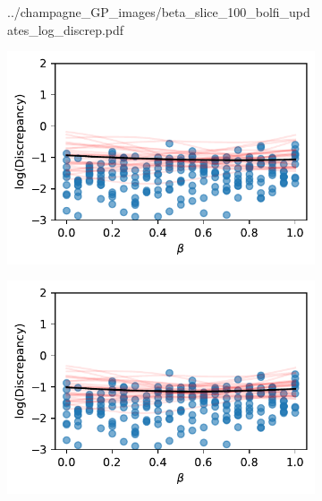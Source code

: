 \begin{figure}[htbp]
\begin{subfigure}[b]{0.5\textwidth}
{            ../champagne_GP_images/beta_slice_100_bolfi_updates_log_discrep.pdf
        }
    \end{subfigure}
    \hfill%
    \begin{subfigure}[b]{0.5\textwidth}
        \centering
        \includegraphics[width=\textwidth]{
            ../champagne_GP_images/beta_slice_200_bolfi_updates_log_discrep.pdf
        }
    \end{subfigure}%
    \hfill%
    \begin{subfigure}[b]{0.5\textwidth}
        \centering
        \includegraphics[width=\textwidth]{
            ../champagne_GP_images/beta_slice_300_bolfi_updates_log_discrep.pdf
        }
    \end{subfigure}%
    \hfill%
    \begin{subfigure}[b]{0.5\textwidth}
        \centering

\end{subfigure}
\end{figure}
